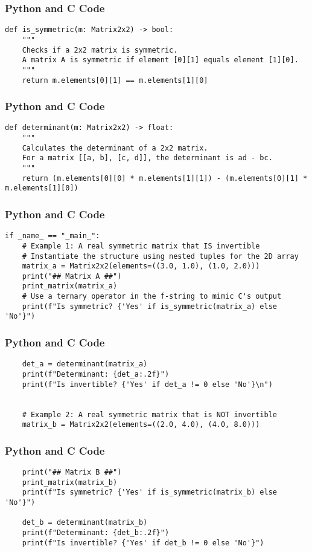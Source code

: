 \documentclass{beamer}
\begin{document}
\begin{frame}[fragile]
\frametitle{Python and C Code}
\begin{lstlisting}
def is_symmetric(m: Matrix2x2) -> bool:
    """
    Checks if a 2x2 matrix is symmetric.
    A matrix A is symmetric if element [0][1] equals element [1][0].
    """
    return m.elements[0][1] == m.elements[1][0]
\end{lstlisting}
\end{frame}

\begin{frame}[fragile]
\frametitle{Python and C Code}
\begin{lstlisting}
def determinant(m: Matrix2x2) -> float:
    """
    Calculates the determinant of a 2x2 matrix.
    For a matrix [[a, b], [c, d]], the determinant is ad - bc.
    """
    return (m.elements[0][0] * m.elements[1][1]) - (m.elements[0][1] * m.elements[1][0])
\end{lstlisting}
\end{frame}

\begin{frame}[fragile]
\frametitle{Python and C Code}
\begin{lstlisting}
if _name_ == "_main_":
    # Example 1: A real symmetric matrix that IS invertible
    # Instantiate the structure using nested tuples for the 2D array
    matrix_a = Matrix2x2(elements=((3.0, 1.0), (1.0, 2.0)))
    print("## Matrix A ##")
    print_matrix(matrix_a)
    # Use a ternary operator in the f-string to mimic C's output
    print(f"Is symmetric? {'Yes' if is_symmetric(matrix_a) else 'No'}")
\end{lstlisting}
\end{frame}

\begin{frame}[fragile]
\frametitle{Python and C Code}
\begin{lstlisting}
    det_a = determinant(matrix_a)
    print(f"Determinant: {det_a:.2f}")
    print(f"Is invertible? {'Yes' if det_a != 0 else 'No'}\n")


    # Example 2: A real symmetric matrix that is NOT invertible
    matrix_b = Matrix2x2(elements=((2.0, 4.0), (4.0, 8.0)))
\end{lstlisting}
\end{frame}

\begin{frame}[fragile]
\frametitle{Python and C Code}
\begin{lstlisting}
    print("## Matrix B ##")
    print_matrix(matrix_b)
    print(f"Is symmetric? {'Yes' if is_symmetric(matrix_b) else 'No'}")

    det_b = determinant(matrix_b)
    print(f"Determinant: {det_b:.2f}")
    print(f"Is invertible? {'Yes' if det_b != 0 else 'No'}")
\end{lstlisting}
\end{frame}
\end{document}
